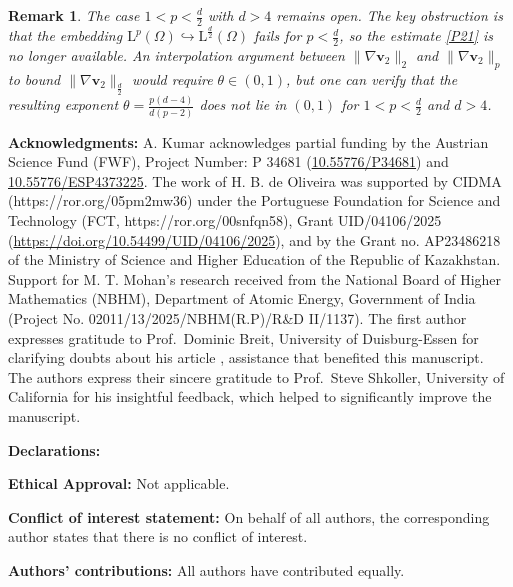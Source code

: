 \documentclass[12pt,reqno]{amsart}
\numberwithin{equation}{section}
\newtheorem{remark}[theorem]{Remark}
\theoremstyle{definition}
\def\L{\mathrm{L}}
\def\bf0{\mathbf{0}}
\begin{document}
{{\begin{remark}
The case $1 < p < \frac{d}{2}$ with $d > 4$ remains open.
The key obstruction is that the embedding
$\L^p(\Omega) \hookrightarrow \L^{\frac{d}{2}}(\Omega)$ fails for
$p < \frac{d}{2}$, so the estimate \eqref{P21} is no longer
available. 
An interpolation argument between
$\|\nabla\boldsymbol{v}_2\|_2$ and $\|\nabla\boldsymbol{v}_2\|_p$
to bound $\|\nabla\boldsymbol{v}_2\|_{\frac{d}{2}}$ would require
$\theta \in (0,1)$, but one can verify that the resulting
exponent $\theta = \frac{p(d-4)}{d(p-2)}$ does not lie in
$(0,1)$ for $1 < p < \frac{d}{2}$ and $d > 4$.
\end{remark}



	\medskip\noindent
\textbf{Acknowledgments:} A. Kumar acknowledges partial funding by the Austrian Science Fund (FWF), Project Number: P 34681 (\href{https://www.fwf.ac.at/en/research-radar/10.55776/P34681}{10.55776/P34681}) and \href{https://www.fwf.ac.at/forschungsradar/10.55776/ESP4373225}{10.55776/ESP4373225}.
The work of H. B. de Oliveira was supported by CIDMA (https://ror.org/05pm2mw36)
under the Portuguese Foundation for Science and Technology
(FCT, https://ror.org/00snfqn58), Grant
UID/04106/2025 (\url{https://doi.org/10.54499/UID/04106/2025}), and by the Grant no. AP23486218 of the Ministry of Science and Higher Education of the Republic of Kazakhstan.
Support for M. T. Mohan's research received from the National Board of Higher Mathematics (NBHM), Department of Atomic Energy, Government of India (Project No. 02011/13/2025/NBHM(R.P)/R\&D II/1137). The first author expresses gratitude to Prof.~Dominic Breit, University of Duisburg-Essen for clarifying doubts about his article \cite{Breit:2015}, assistance that benefited this manuscript. The authors express their sincere gratitude to Prof.~Steve Shkoller, University of California for his insightful feedback, which helped to significantly improve the manuscript.

\medskip\noindent	\textbf{Declarations:}

\noindent 	\textbf{Ethical Approval:}   Not applicable.

\noindent  \textbf{Conflict of interest statement: } On behalf of all authors, the corresponding author states that there is no conflict of interest.


\noindent 	\textbf{Authors' contributions: } All authors have contributed equally.

}}
\end{document}
